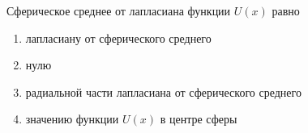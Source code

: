 Сферическое среднее от лапласиана функции \(U(x)\) равно

\begin{enumerate}[label=\arabic*)]
    \item лапласиану от сферического среднего
    \item нулю
    \item радиальной части лапласиана от сферического среднего
    \item значению функции \(U(x)\) в центре сферы
\end{enumerate}

